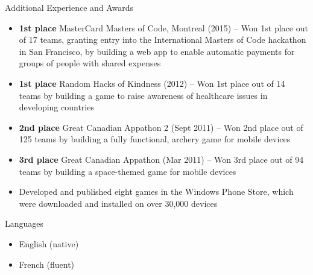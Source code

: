 \documentclass[]{cv}
\begin{document}
	\begin{cvsection}{Additional Experience and Awards}
		\begin{cvsubsection}{}{}{}
			\begin{itemize}
				\item \textbf{1st place} MasterCard Masters of Code, Montreal (2015) -- Won 1st place out of 17 teams, granting entry into the International Masters of Code hackathon in San Francisco, by building a web app to enable automatic payments for groups of people with shared expenses
				\item \textbf{1st place} Random Hacks of Kindness (2012) -- Won 1st place out of 14 teams by building a game to raise awareness of healthcare issues in developing countries
				\item \textbf{2nd place} Great Canadian Appathon 2 (Sept 2011) -- Won 2nd place out of 125 teams by building a fully functional, archery game for mobile devices
				\item \textbf{3rd place} Great Canadian Appathon (Mar 2011) -- Won 3rd place out of 94 teams by building a space-themed game for mobile devices
				\item Developed and published eight games in the Windows Phone Store, which were downloaded and installed on over 30,000 devices
			\end{itemize}
		\end{cvsubsection}
	\end{cvsection}

	\begin{cvsection}{Languages}
		\begin{cvsubsection}{}{}{}
			\begin{itemize}
				\item English (native)
				\item French (fluent)
			\end{itemize}
		\end{cvsubsection}
	\end{cvsection}
\end{document}
